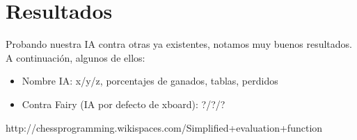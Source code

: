 \documentclass{article}
\begin{document}
\section{Resultados}
Probando nuestra IA contra otras ya existentes, notamos muy buenos resultados. A continuación, algunos de ellos:

\begin{itemize}
\item Nombre IA: \hfill x/y/z, porcentajes de ganados, tablas, perdidos
\item Contra Fairy (IA por defecto de xboard): \hfill ?/?/?
\end{itemize}


\begin{thebibliography}{9}

  http://chessprogramming.wikispaces.com/Simplified+evaluation+function

\end{thebibliography}
\end{document}
